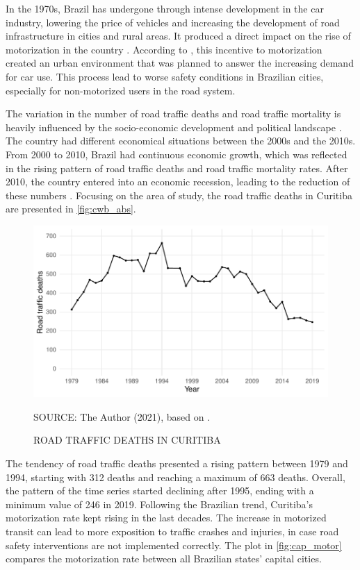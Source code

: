 In the 1970s, Brazil has undergone through intense development in the car industry, lowering the price of vehicles and increasing the development of road infrastructure in cities and rural areas. It produced a direct impact on the rise of motorization in the country \cite{Vasconcellos2013}. According to \textcite{Harvey1982}, this incentive to motorization created an urban environment that was planned to answer the increasing demand for car use. This process lead to worse safety conditions in Brazilian cities, especially for non-motorized users in the road system.   

The variation in the number of road traffic deaths and road traffic mortality is heavily influenced by the socio-economic development and political landscape \cite{Ferraz2012}. The country had different economical situations between the 2000s and the 2010s. From 2000 to 2010, Brazil had continuous economic growth, which was reflected in the rising pattern of road traffic deaths and road traffic mortality rates. After 2010, the country entered into an economic recession, leading to the reduction of these numbers \cite{Bastos2020}. Focusing on the area of study, the road traffic deaths in Curitiba are presented in \autoref{fig:cwb_abs}.   

\begin{figure}[!htbp]
    \centering\footnotesize
    \captionsetup{font=footnotesize}
    \caption{ROAD TRAFFIC DEATHS IN CURITIBA}
    \includegraphics{fig/cwb_abs.pdf}
    \label{fig:cwb_abs}
    \par SOURCE: The Author (2021), based on \textcite{MinistryofHealth2020}.
\end{figure}  

The tendency of road traffic deaths presented a rising pattern between 1979 and 1994, starting with 312 deaths and reaching a maximum of 663 deaths. Overall, the pattern of the time series started declining after 1995, ending with a minimum value of 246 in 2019. Following the Brazilian trend, Curitiba's motorization rate kept rising in the last decades. The increase in motorized transit can lead to more exposition to traffic crashes and injuries, in case road safety interventions are not implemented correctly. The plot in \autoref{fig:cap_motor} compares the motorization rate between all Brazilian states' capital cities.    

